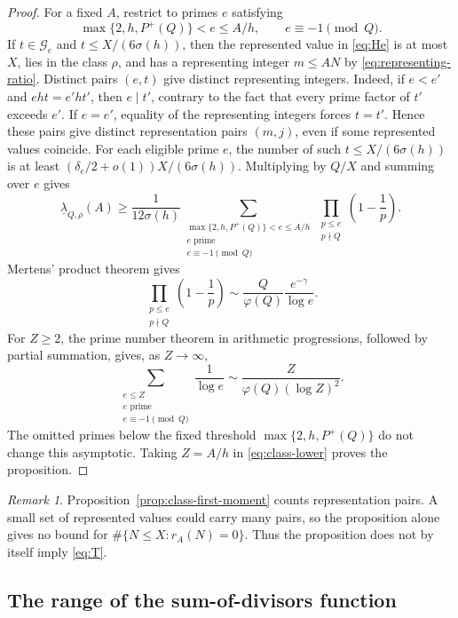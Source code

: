 \documentclass[11pt]{article}
\theoremstyle{remark}
\newtheorem{remark}[theorem]{Remark}
\newcommand{\1}{\mathbf 1}
\begin{document}
\begin{proof}
For a fixed $A$, restrict to primes $e$ satisfying
\[
 \max\{2,h,P^+(Q)\}<e\leq A/h,
 \qquad e\equiv-1\pmod Q.
\]
If $t\in\mathcal G_e$ and $t\leq X/(6\sigma(h))$, then the represented value in
\eqref{eq:He} is at most $X$, lies in the class $\rho$, and has a representing integer
$m\leq AN$ by \eqref{eq:representing-ratio}.  Distinct pairs $(e,t)$ give
distinct representing integers.  Indeed, if $e<e'$ and $eht=e'ht'$, then $e\mid t'$,
contrary to the fact that every prime factor of $t'$ exceeds $e'$.  If
$e=e'$, equality of the representing integers forces $t=t'$.  Hence these pairs give distinct representation pairs $(m,j)$, even if some
represented values coincide.  For each eligible prime $e$, the number of
such $t\leq X/(6\sigma(h))$ is at least
$(\delta_e/2+o(1))X/(6\sigma(h))$.  Multiplying by $Q/X$ and summing over
$e$ gives
\begin{equation}\label{eq:class-lower}
 \underline\lambda_{Q,\rho}(A)
 \geq\frac1{12\sigma(h)}
 \sum_{\substack{\max\{2,h,P^+(Q)\}<e\leq A/h\\
                  e\text{ prime}\\e\equiv-1\pmod Q}}
 \prod_{\substack{p\leq e\\p\nmid Q}}\left(1-\frac1p\right).
\end{equation}
Mertens' product theorem gives
\[
 \prod_{\substack{p\leq e\\p\nmid Q}}
 \left(1-\frac1p\right)
 \sim\frac Q{\varphi(Q)}\frac{e^{-\gamma}}{\log e}.
\]
For $Z\geq2$, the prime number theorem in arithmetic progressions, followed
by partial summation, gives, as $Z\to\infty$,
\[
 \sum_{\substack{e\leq Z\\e\text{ prime}\\e\equiv-1\pmod Q}}
 \frac1{\log e}
 \sim\frac{Z}{\varphi(Q)(\log Z)^2}.
\]
The omitted primes below the fixed threshold $\max\{2,h,P^+(Q)\}$ do not
change this asymptotic.  Taking $Z=A/h$ in \eqref{eq:class-lower} proves the
proposition.
\end{proof}

\begin{remark}
Proposition~\ref{prop:class-first-moment} counts representation pairs.  A small set
of represented values could carry many pairs, so the proposition alone gives no bound
for $\#\{N\leq X:r_A(N)=0\}$.  Thus the proposition does not by itself imply
\eqref{eq:T}.
\end{remark}

\subsection{The range of the sum-of-divisors function}
\end{document}

